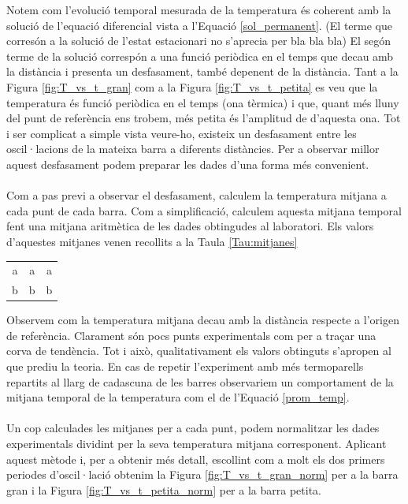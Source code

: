 \documentclass[12pt,twosides,onecolumn,openany]{article}
\newenvironment{Figura}
  {\par\medskip\noindent\minipage{\linewidth}}
  {\endminipage\par\medskip}
\begin{document}
\begin{multicols}{2}
\begin{Figura}
  \label{fig:T_vs_t_petita}
\end{Figura}
Notem com l'evolució temporal mesurada de la temperatura és coherent amb la solució de l'equació diferencial vista a l'Equació \eqref{sol_permanent}. (El terme que corresón a la solució de l'estat estacionari no s'aprecia per bla bla bla) El segón terme de la solució correspón a una funció periòdica en el temps que decau amb la distància i presenta un desfasament, també depenent de la distància. Tant a la Figura \ref{fig:T_vs_t_gran} com a la Figura \ref{fig:T_vs_t_petita} es veu que la temperatura és funció periòdica en el temps (ona tèrmica) i que, quant més lluny del punt de referència ens trobem, més petita és l'amplitud de d'aquesta ona. Tot i ser complicat a simple vista veure-ho, existeix un desfasament entre les oscil·lacions de la mateixa barra a diferents distàncies. Per a observar millor aquest desfasament podem preparar les dades d'una forma més convenient.\\\\
Com a pas previ a observar el desfasament, calculem la temperatura mitjana a cada punt de cada barra. Com a simplificació, calculem aquesta mitjana temporal fent una mitjana aritmètica de les dades obtingudes al laboratori. Els valors d'aquestes mitjanes venen recollits a la Taula \ref{Tau:mitjanes}
\begin{Figura}
  \centering
  \begin{tabular}{c|c|c}
    a & a & a \\
    b & b & b 
  \end{tabular}
  \label{Tau:mitjanes}
\end{Figura}
Observem com la temperatura mitjana decau amb la distància respecte a l'origen de referència. Clarament són pocs punts experimentals com per a traçar una corva de tendència. Tot i això, qualitativament els valors obtinguts s'apropen al que prediu la teoria. En cas de repetir l'experiment amb més termoparells repartits al llarg de cadascuna de les barres observariem un comportament de la mitjana temporal de la temperatura com el de l'Equació \eqref{prom_temp}.\\\\
Un cop calculades les mitjanes per a cada punt, podem normalitzar les dades experimentals dividint per la seva temperatura mitjana corresponent. Aplicant aquest mètode i, per a obtenir més detall, escollint com a molt els dos primers periodes d'oscil·lació obtenim la Figura \ref{fig:T_vs_t_gran_norm} per a la barra gran i la Figura \ref{fig:T_vs_t_petita_norm} per a la barra petita.

\end{multicols}
\end{document}
